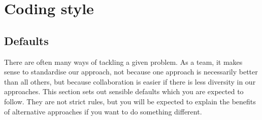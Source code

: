 \documentclass[]{book}
\begin{document}
\hypertarget{coding-style}{%
\section{Coding style}\label{coding-style}}

\hypertarget{defaults}{%
\subsection{Defaults}\label{defaults}}

There are often many ways of tackling a given problem. As a team, it makes sense to standardise our approach, not because one approach is necessarily better than all others, but because collaboration is easier if there is less diversity in our approaches. This section sets out sensible defaults which you are expected to follow. They are not strict rules, but you will be expected to explain the benefits of alternative approaches if you want to do something different.
\end{document}
